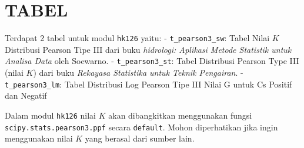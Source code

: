 \documentclass[11pt]{article}
\begin{document}
    \hypertarget{tabel}{%
\section{TABEL}\label{tabel}}

Terdapat 2 tabel untuk modul \texttt{hk126} yaitu: -
\texttt{t\_pearson3\_sw}: Tabel Nilai \(K\) Distribusi Pearson Tipe III
dari buku \emph{hidrologi: Aplikasi Metode Statistik untuk Analisa Data}
oleh Soewarno. - \texttt{t\_pearson3\_st}: Tabel Distribusi Pearson Type
III (nilai \(K\)) dari buku \emph{Rekayasa Statistika untuk Teknik
Pengairan}. - \texttt{t\_pearson3\_lm}: Tabel Distribusi Log Pearson
Tipe III Nilai G untuk Cs Positif dan Negatif

Dalam modul \texttt{hk126} nilai \(K\) akan dibangkitkan menggunakan
fungsi \texttt{scipy.stats.pearson3.ppf} secara \texttt{default}. Mohon
diperhatikan jika ingin menggunakan nilai \(K\) yang berasal dari sumber
lain.
\end{document}
